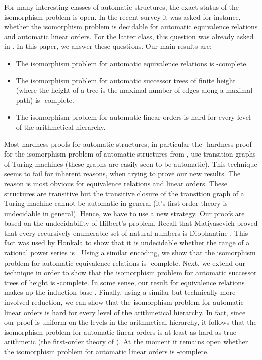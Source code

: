 \documentclass[envcountsame]{llncs}
\begin{document}
For many interesting classes of automatic structures, the exact status of the isomorphism problem
is open. In the recent survey \cite{Rub08} it was asked for instance, whether
the isomorphism problem is decidable for automatic equivalence relations and
automatic linear orders.
For the latter class, this question was already asked in \cite{KhoRS05}.
In this paper, we answer these questions.
Our main results are:
\begin{itemize}
\item The isomorphism problem for  automatic equivalence relations
is -complete.
\item The isomorphism problem for automatic successor trees of finite height
 (where the height of a tree is the maximal number of edges along
a maximal path) is -complete.
\item The isomorphism problem for automatic linear orders is
hard for every level of the arithmetical hierarchy.
\end{itemize}
Most hardness proofs for automatic structures, in particular the
-hardness proof for the isomorphism problem of automatic
structures from \cite{KhoNRS07}, use transition graphs of
Turing-machines (these graphs are easily seen to be automatic). This
technique seems to fail for inherent reasons, when trying to prove our
new results. The reason is most obvious for equivalence relations and
linear orders. These structures are transitive but the transitive
closure of the transition graph of a Turing-machine cannot be
automatic in general (it's first-order theory is undecidable in
general). Hence, we have to use a new strategy. Our proofs are based
on the undecidability of Hilbert's  problem. Recall that
Matiyasevich proved that every recursively enumerable set of natural
numbers is Diophantine \cite{Mat93}. This fact was used by Honkala to
show that it is undecidable whether the range of a rational power
series is  \cite{Hon06}.  Using a similar encoding, we
show that the isomorphism problem for automatic equivalence relations
is -complete. Next, we extend our technique in order to show
that the isomorphism problem for automatic successor trees of height
 is -complete. In some sense, our result
for equivalence relations makes up the induction base .
Finally, using a similar but
technically more involved reduction, we can show that the isomorphism
problem for automatic linear orders is hard for every level of the
arithmetical hierarchy. In fact, since our proof is uniform on the
levels in the arithmetical hierarchy, it follows that
the isomorphism problem for automatic linear orders is at least
as hard as true arithmetic (the first-order theory of
).  
At the moment it remains open whether the isomorphism problem for
automatic linear orders is -complete.
\end{document}
